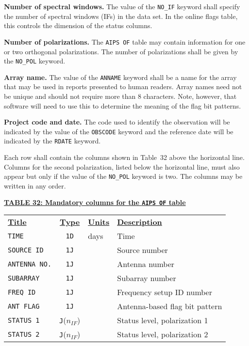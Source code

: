 \documentclass[twoside]{article}
\newcommand{\nif}{$n_{IF}$}
\begin{document}
{\bf Number of spectral windows.} The value of the {\tt NO\_IF}
keyword shall specify the number of spectral windows (IFs) in the data
set.  In the online flags table, this controls the dimension of the
status columns.

{\bf Number of polarizations.}  The {\tt AIPS OF} table may contain
information for one or two orthogonal polarizations.  The number of
polarizations shall be given by the {\tt NO\_POL} keyword.

{\bf Array name.}  The value of the {\tt ANNAME} keyword shall be a
name for the array that may be used in reports presented to human
readers.  Array names need not be unique and should not require
more than 8 characters.  Note, however, that software will need to use
this to determine the meaning of the flag bit patterns.

{\bf Project code and date.}  The code used to identify the
observation will be indicated by the value of the {\tt OBSCODE}
keyword and the reference date will be indicated by the {\tt RDATE}
keyword.

Each row shall contain the columns shown in Table~32 above the
horizontal line.  Columns for the second polarization, listed below
the horizontal line, must also appear but only if the value of the
{\tt NO\_POL} keyword is two.  The columns may be written in any
order.

\begin{center}
\underline{\bf{TABLE 32: Mandatory columns for the {\tt AIPS OF} table}}\\
\begin{tabular}{lcll}
\noalign{\vspace{2pt}} \label{ta:OFcols}
\underline{{\bf Title\vphantom{y}}} & \underline{\bf{Type}} &
   \underline{{\bf Units\vphantom{y}}} & \underline{\bf{Description}} \\
\noalign{\vspace{2pt}}
{\tt TIME}        & {\tt 1D} & days & Time \\
{\tt SOURCE ID}   & {\tt 1J} &      & Source number \\
{\tt ANTENNA NO.} & {\tt 1J} &      & Antenna number \\
{\tt SUBARRAY}    & {\tt 1J} &      & Subarray number \\
{\tt FREQ ID}     & {\tt 1J} &      & Frequency setup ID number \\
{\tt ANT FLAG}    & {\tt 1J} &      & Antenna-based flag bit pattern \\
{\tt STATUS 1}    & {\tt J}(\nif) & & Status level, polarization 1 \\
\hline
{\tt STATUS 2}    & {\tt J}(\nif) & & Status level, polarization 2
\end{tabular}
\end{center}
\end{document}
